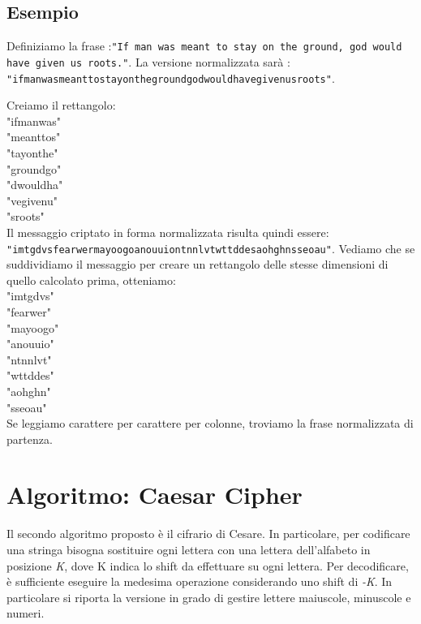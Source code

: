 \subsection{Esempio}
Definiziamo la frase :\texttt{"If man was meant to stay on the ground, god would have given us roots."}.
La versione normalizzata sarà : \texttt{"ifmanwasmeanttostayonthegroundgodwouldhavegivenusroots"}.

Creiamo il rettangolo: \\

\noindent"ifmanwas" \\
"meanttos" \\
"tayonthe" \\ 
"groundgo" \\
"dwouldha" \\
"vegivenu" \\
"sroots\;\;\;\;" \\

Il messaggio criptato in forma normalizzata risulta quindi essere: \texttt{"imtgdvsfearwermayoogoanouuiontnnlvtwttddesaohghnsseoau"}.
Vediamo che se suddividiamo il messaggio per creare un rettangolo delle stesse dimensioni di quello calcolato prima, otteniamo: \\

\noindent"imtgdvs" \\
"fearwer" \\
"mayoogo" \\
"anouuio" \\
"ntnnlvt" \\
"wttddes" \\
"aohghn\;\;" \\
"sseoau\;\;" \\

Se leggiamo carattere per carattere per colonne, troviamo la frase normalizzata di partenza.

\section{Algoritmo: Caesar Cipher}
Il secondo algoritmo proposto è il cifrario di Cesare. In particolare, per codificare una stringa bisogna sostituire ogni lettera con una lettera dell'alfabeto in posizione \textit{K}, dove K indica lo shift da effettuare su ogni lettera. Per decodificare, è sufficiente eseguire la medesima operazione considerando uno shift di \textit{-K}. In particolare si riporta la versione in grado di gestire lettere maiuscole, minuscole e numeri. 

